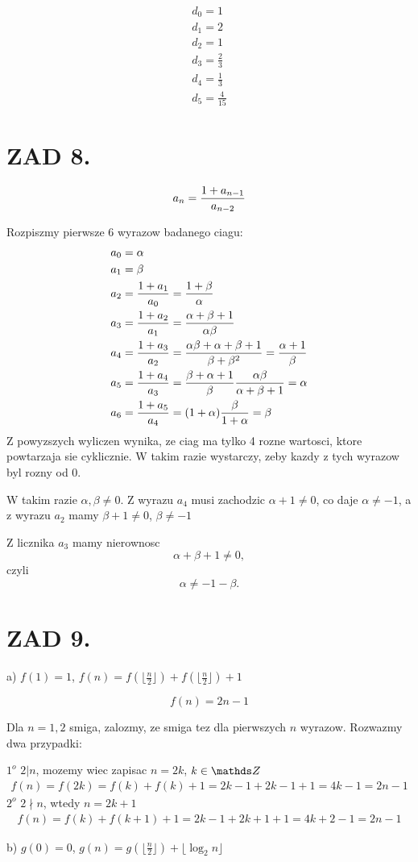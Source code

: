 \documentclass{article}[13pt]
\begin{document}
    \begin{align*}
        d_0=1\\
        d_1=2\\
        d_2=1\\
        d_3=\frac23\\
        d_4=\frac13\\
        d_5=\frac4{15}
    \end{align*}

    \section*{ZAD 8.}
    $$a_n={1+a_{n-1}\over a_{n-2}}$$
    
    Rozpiszmy pierwsze 6 wyrazow badanego ciagu:
    \begin{align*}
        a_0&=\alpha\\
        a_1&=\beta\\
        a_2&={1+a_1\over a_0}={1+\beta\over\alpha}\\
        a_3&={1+a_2\over a_1}={\alpha+\beta+1\over \alpha\beta}\\
        a_4&={1+a_3\over a_2}={\alpha\beta+\alpha+\beta+1\over\beta+\beta^2}={\alpha+1\over\beta}\\
        a_5&={1+a_4\over a_3}={\beta+\alpha+1\over\beta}{\alpha\beta\over\alpha+\beta+1}=\alpha\\
        a_6&={1+a_5\over a_4}=(1+\alpha){\beta\over1+\alpha}=\beta
    \end{align*}
    Z powyzszych wyliczen wynika, ze ciag ma tylko 4 rozne wartosci, ktore powtarzaja sie cyklicznie. W takim razie wystarczy, zeby kazdy z tych wyrazow byl rozny od 0. 
    \medskip
    
    W takim razie $\alpha,\beta\neq0$. Z wyrazu $a_4$ musi zachodzic $\alpha+1\neq0$, co daje $\alpha\neq -1$, a z wyrazu $a_2$ mamy $\beta+1\neq0$, $\beta\neq-1$
    \medskip

    Z licznika $a_3$ mamy nierownosc
    $$\alpha+\beta+1\neq0,$$
    czyli
    $$\alpha\neq-1-\beta.$$

    \section*{ZAD 9.}

    a) $f(1)=1$, $f(n)=f(\lfloor\frac n2\rfloor)+f(\lfloor\frac n2\rfloor)+1$

    $$f(n)=2n-1$$

    Dla $n=1,2$ smiga, zalozmy, ze smiga tez dla pierwszych $n$ wyrazow. Rozwazmy dwa przypadki:
    
    \indent $1^o$ $2|n$, mozemy wiec zapisac $n=2k$, $k\in\Z$
    \begin{align*}
        f(n)=f(2k)=f(k)+f(k)+1=2k-1+2k-1+1=4k-1=2n-1
    \end{align*}
    \indent $2^o$ $2\nmid n$, wtedy $n=2k+1$
    \begin{align*}
        f(n)=f(k)+f(k+1)+1=2k-1+2k+1+1=4k+2-1=2n-1
    \end{align*}
    \medskip

    b) $g(0)=0$, $g(n)=g(\lfloor\frac n2\rfloor)+\lfloor\log_2n\rfloor$
\end{document}
